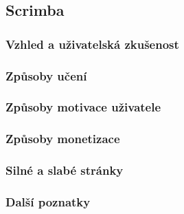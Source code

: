 \subsection{Scrimba}


\subsubsection{Vzhled a uživatelská zkušenost}









 

\subsubsection{Způsoby učení}






\subsubsection{Způsoby motivace uživatele}



\subsubsection{Způsoby monetizace}






\subsubsection{Silné a slabé stránky}





\subsubsection{Další poznatky}




